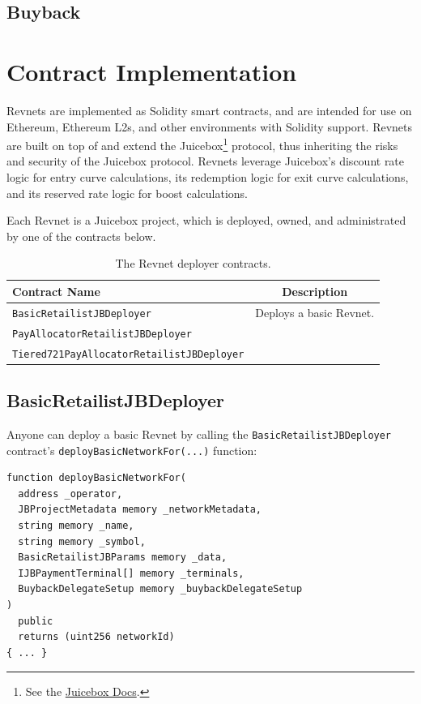 \documentclass{article}
\begin{document}
\subsection{Buyback}

\section{Contract Implementation}

Revnets are implemented as Solidity smart contracts, and are intended for use on Ethereum, Ethereum L2s,  and other environments with Solidity support. Revnets are built on top of and extend the Juicebox\footnote{See the \href{https://docs.juicebox.money}{Juicebox Docs}.} protocol, thus inheriting the risks and security of the Juicebox protocol. Revnets leverage Juicebox's discount rate logic for entry curve calculations, its redemption logic for exit curve calculations, and its reserved rate logic for boost calculations.

Each Revnet is a Juicebox project, which is deployed, owned, and administrated by one of the contracts below.

\begin{table}[h]
  \centering
  \begin{tabular}{|l|c|}
    \hline
    Contract Name & Description \\
    \hline
    \texttt{BasicRetailistJBDeployer} & Deploys a basic Revnet. \\
    \hline
    \texttt{PayAllocatorRetailistJBDeployer} & \\
    \hline
    \texttt{Tiered721PayAllocatorRetailistJBDeployer} & \\
    \hline
  \end{tabular}
  \caption{The Revnet deployer contracts.}
\end{table}

\subsection{BasicRetailistJBDeployer}

Anyone can deploy a basic Revnet by calling the \texttt{BasicRetailistJBDeployer} contract's \texttt{deployBasicNetworkFor(...)} function:

\begin{lstlisting}[language=Solidity]
function deployBasicNetworkFor(
  address _operator,
  JBProjectMetadata memory _networkMetadata,
  string memory _name,
  string memory _symbol,
  BasicRetailistJBParams memory _data,
  IJBPaymentTerminal[] memory _terminals,
  BuybackDelegateSetup memory _buybackDelegateSetup
)
  public
  returns (uint256 networkId)
{ ... }
\end{lstlisting}
\end{document}
